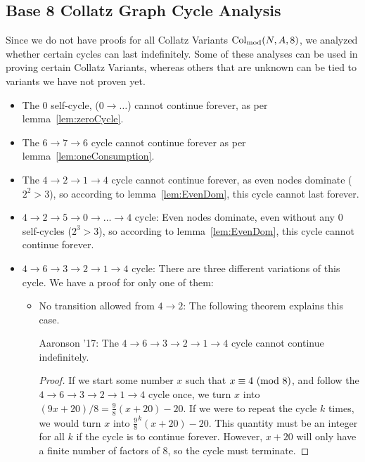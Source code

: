 \subsection{Base 8 Collatz Graph Cycle Analysis} \label{subsubsec:cycleanalysis}
Since we do not have proofs for all Collatz Variants $\mathrm{Col}_{\text{mod}}(N,A,8)$, we analyzed whether certain cycles can last indefinitely. Some of these analyses can be used in proving certain Collatz Variants, whereas others that are unknown can be tied to variants we have not proven yet.
\begin{itemize}
    \item The 0 self-cycle, ($0  \rightarrow \ldots$) cannot continue forever, as per lemma~\ref{lem:zeroCycle}.
    \item The $6 \rightarrow 7 \rightarrow 6$ cycle cannot continue forever as per lemma~\ref{lem:oneConsumption}.
    \item The $4 \rightarrow 2 \rightarrow 1 \rightarrow 4$ cycle cannot continue forever, as even nodes dominate ($2^2 > 3$), so according to lemma~\ref{lem:EvenDom}, this cycle cannot last forever.
    \item $4 \rightarrow 2 \rightarrow 5 \rightarrow 0  \rightarrow \ldots \rightarrow 4$ cycle:  Even nodes dominate, even without any 0 self-cycles ($2^3 > 3$), so according to lemma~\ref{lem:EvenDom}, this cycle cannot continue forever.
    \item $4 \rightarrow 6 \rightarrow 3 \rightarrow 2 \rightarrow 1 \rightarrow 4$ cycle: There are three different variations of this cycle. We have a proof for only one of them:
\begin{itemize}
  \item No transition allowed from $4 \rightarrow 2$: The following theorem explains this case.
  \begin{theorem} Aaronson '17: The $4 \rightarrow 6 \rightarrow 3 \rightarrow 2 \rightarrow 1 \rightarrow 4$ cycle cannot continue indefinitely.
  \end{theorem}
  \begin{proof}
    If we start some number $x$ such that $x \equiv 4\ (\mathrm{mod}\ 8)$, and follow the $4 \rightarrow 6 \rightarrow 3 \rightarrow 2 \rightarrow 1 \rightarrow 4$ cycle once, we turn $x$ into $(9x+20)/8 = \frac{9}{8}(x+20)-20$. If we were to repeat the cycle $k$ times, we would turn $x$ into $\frac{9}{8}^k(x+20)-20$. This quantity must be an integer for all $k$ if the cycle is to continue forever. However, $x+20$ will only have a finite number of factors of 8, so the cycle must terminate.

\end{proof}
\end{itemize}
\end{itemize}
